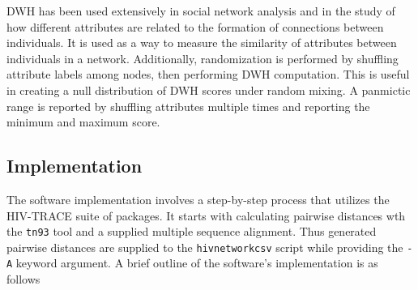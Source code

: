 \documentclass[utf8]{FrontiersinHarvard} %
\begin{document}
DWH has been used extensively in social network analysis and in the study of
how different attributes are related to the formation of connections between
individuals. It is used as a way to measure the similarity of attributes
between individuals in a network. Additionally, randomization is performed by
shuffling attribute labels among nodes, then performing DWH computation. This
is useful in creating a null distribution of DWH scores under random mixing. A
panmictic range is reported by shuffling attributes multiple times and
reporting the minimum and maximum score.

\subsection{Implementation}

The software implementation involves a step-by-step process that utilizes the
HIV-TRACE suite of packages. It starts with calculating pairwise distances wth
the {\tt tn93} tool and a supplied multiple sequence alignment. Thus generated
pairwise distances are supplied to the {\tt hivnetworkcsv} script while
providing the {\tt -A} keyword argument. A brief outline of the software's
implementation is as follows
\end{document}
